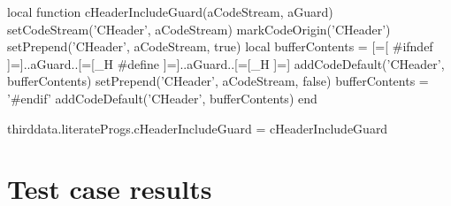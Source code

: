\startMkIVCode
\def\CHeaderIncludeGuard#1#2{
  \directlua{
    thirddata.literateProgs.cHeaderIncludeGuard('#1', '#2')
  }
}
\stopMkIVCode

\startLuaCode
local function cHeaderIncludeGuard(aCodeStream, aGuard)
  setCodeStream('CHeader', aCodeStream)
  markCodeOrigin('CHeader')
  setPrepend('CHeader', aCodeStream, true)
  local bufferContents = [=[
#ifndef ]=]..aGuard..[=[_H
#define ]=]..aGuard..[=[_H
]=]
  addCodeDefault('CHeader', bufferContents)
  setPrepend('CHeader', aCodeStream, false)
  bufferContents = '#endif'
  addCodeDefault('CHeader', bufferContents)
end

thirddata.literateProgs.cHeaderIncludeGuard = cHeaderIncludeGuard
\stopLuaCode




\section{Test case results}

\reportMkIVStats

\reportLuaStats

\reportFailures

\stopchapter
